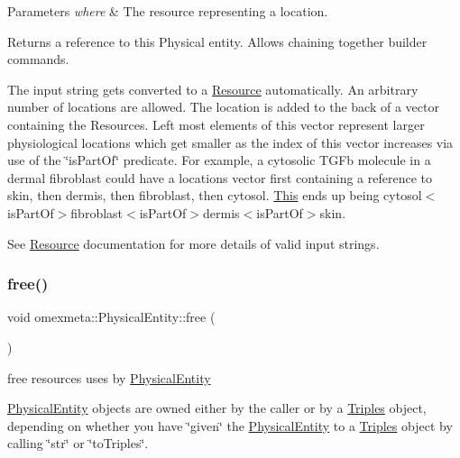 \begin{DoxyParams}{Parameters}
{\em where} & The resource representing a location. \\
\hline
\end{DoxyParams}
\begin{DoxyReturn}{Returns}
a reference to this Physical entity. Allows chaining together builder commands.
\end{DoxyReturn}
The input string gets converted to a \hyperlink{classomexmeta_1_1Resource}{Resource} automatically. An arbitrary number of locations are allowed. The location is added to the back of a vector containing the Resources. Left most elements of this vector represent larger physiological locations which get smaller as the index of this vector increases via use of the \char`\"{}is\+Part\+Of\char`\"{} predicate. For example, a cytosolic T\+G\+Fb molecule in a dermal fibroblast could have a locations vector first containing a reference to skin, then dermis, then fibroblast, then cytosol. \hyperlink{classThis}{This} ends up being cytosol$<$is\+Part\+Of$>$fibroblast$<$is\+Part\+Of$>$dermis$<$is\+Part\+Of$>$skin.

See \hyperlink{classomexmeta_1_1Resource}{Resource} documentation for more details of valid input strings. \mbox{\label{classomexmeta_1_1PhysicalEntity_a6fd4acd7255a01322c4a53d3e84df0ba}} 
\subsubsection{\texorpdfstring{free()}{free()}}
{\footnotesize\ttfamily void omexmeta\+::\+Physical\+Entity\+::free (\begin{DoxyParamCaption}{ }\end{DoxyParamCaption})}



free resources uses by \hyperlink{classomexmeta_1_1PhysicalEntity}{Physical\+Entity} 

\hyperlink{classomexmeta_1_1PhysicalEntity}{Physical\+Entity} objects are owned either by the caller or by a \hyperlink{classomexmeta_1_1Triples}{Triples} object, depending on whether you have \char`\"{}given\char`\"{} the \hyperlink{classomexmeta_1_1PhysicalEntity}{Physical\+Entity} to a \hyperlink{classomexmeta_1_1Triples}{Triples} object by calling \char`\"{}str\char`\"{} or \char`\"{}to\+Triples\char`\"{}. \mbox{\label{classomexmeta_1_1PhysicalEntity_ae4b3374e9ebb817eb63f9105b491e958}} 
